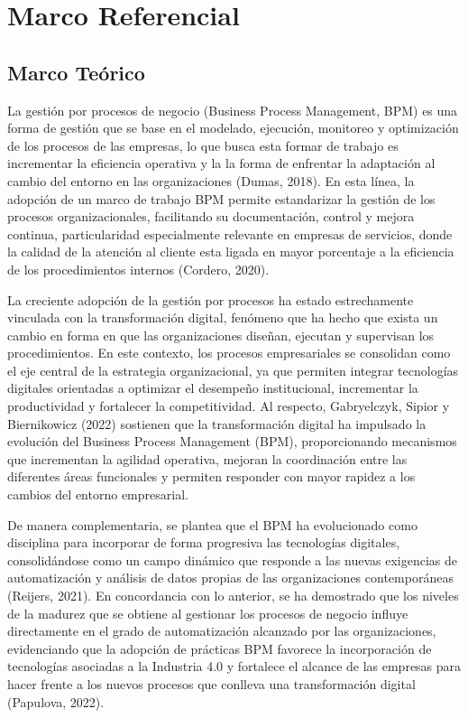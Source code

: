 \chapter{Marco Referencial}
\section{Marco Teórico}

La gestión por procesos de negocio (Business Process Management, BPM) es una forma de gestión que se base en el modelado, ejecución, monitoreo y optimización de los procesos de las empresas, lo que busca esta formar de trabajo es incrementar la eficiencia operativa y la la forma de enfrentar la adaptación al cambio del entorno en las organizaciones (Dumas, 2018). En
esta línea, la adopción de un marco de trabajo BPM permite estandarizar la gestión de los procesos organizacionales, facilitando su documentación, control y mejora continua, particularidad especialmente relevante en empresas de servicios, donde la calidad de la atención al cliente esta ligada en mayor porcentaje a la eficiencia de los procedimientos internos (Cordero, 2020).

La creciente adopción de la gestión por procesos ha estado estrechamente vinculada con la transformación digital, fenómeno que ha hecho que exista un cambio en forma en que las organizaciones diseñan, ejecutan y supervisan los procedimientos. En este contexto, los procesos empresariales se consolidan como el eje central de la estrategia organizacional, ya que permiten integrar tecnologías digitales orientadas a optimizar el desempeño institucional, incrementar la productividad y fortalecer la competitividad. Al respecto, Gabryelczyk, Sipior y Biernikowicz (2022) sostienen que la transformación digital ha impulsado la evolución del Business Process Management (BPM), proporcionando mecanismos que incrementan la agilidad operativa, mejoran la coordinación entre las diferentes áreas funcionales y permiten responder con mayor rapidez a los cambios del entorno empresarial.

De manera complementaria, se plantea que el BPM ha evolucionado como disciplina para incorporar de forma progresiva las tecnologías digitales, consolidándose como un campo dinámico que responde a las nuevas exigencias de automatización y análisis de datos propias de las organizaciones contemporáneas (Reijers, 2021). En concordancia con lo anterior, se
ha demostrado que los niveles de la madurez que se obtiene al gestionar los procesos de negocio influye directamente en el grado de automatización alcanzado por las organizaciones, evidenciando que la adopción de prácticas BPM favorece la incorporación de tecnologías asociadas a la Industria 4.0 y fortalece el alcance de las empresas para hacer frente a los nuevos procesos que conlleva una transformación digital (Papulova, 2022).

